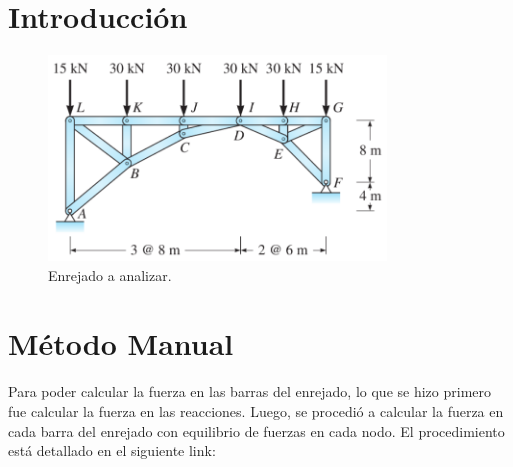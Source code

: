 \documentclass{article}  %
\begin{document}
\newpage
\thispagestyle{empty} %

\newpage
\thispagestyle{empty} %
\tableofcontents
\thispagestyle{plain} %
\thispagestyle{empty} %

\thispagestyle{empty}
\listoffigures 
\thispagestyle{plain} %
\thispagestyle{empty}
\newpage
\setcounter{page}{1}
\section{Introducción}

\begin{figure}[h]
  \centering
  \includegraphics[width=0.8\textwidth]{imagenes/diagrama.png}
  \caption{Enrejado a analizar.}
\end{figure}

\newpage
\section{Método Manual}
Para poder calcular la fuerza en las barras del enrejado, lo que se hizo primero fue calcular la fuerza en las reacciones. Luego, se procedió a calcular la fuerza en cada barra del enrejado con equilibrio de fuerzas en cada nodo. El procedimiento está detallado en el siguiente link: 
\end{document}
